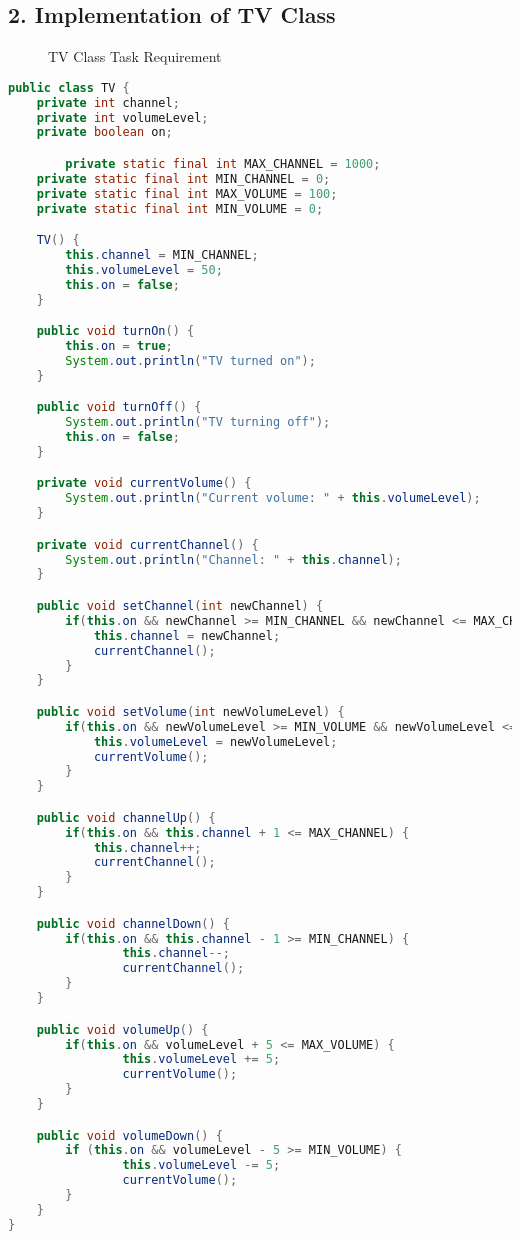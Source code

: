 \documentclass{article}
\begin{document}
\subsection*{2. Implementation of TV Class}

\begin{figure}[h]
    \centering
    \caption{TV Class Task Requirement}
\end{figure}

\begin{lstlisting}[language=Java, caption=TV.java]
public class TV {
    private int channel;
    private int volumeLevel;
    private boolean on;

        private static final int MAX_CHANNEL = 1000;
    private static final int MIN_CHANNEL = 0;
    private static final int MAX_VOLUME = 100;
    private static final int MIN_VOLUME = 0;

    TV() {
        this.channel = MIN_CHANNEL;
        this.volumeLevel = 50;
        this.on = false;
    }

    public void turnOn() {
        this.on = true;
        System.out.println("TV turned on");
    }

    public void turnOff() {
        System.out.println("TV turning off");
        this.on = false;
    }

    private void currentVolume() {
        System.out.println("Current volume: " + this.volumeLevel);
    }

    private void currentChannel() {
        System.out.println("Channel: " + this.channel);
    }

    public void setChannel(int newChannel) {
        if(this.on && newChannel >= MIN_CHANNEL && newChannel <= MAX_CHANNEL) {
            this.channel = newChannel;
            currentChannel();
        }
    }

    public void setVolume(int newVolumeLevel) {
        if(this.on && newVolumeLevel >= MIN_VOLUME && newVolumeLevel <= MAX_VOLUME && newVolumeLevel % 5 == 0) {
            this.volumeLevel = newVolumeLevel;
            currentVolume();
        }
    }

    public void channelUp() {
        if(this.on && this.channel + 1 <= MAX_CHANNEL) {
            this.channel++;
            currentChannel();
        }
    }

    public void channelDown() {
        if(this.on && this.channel - 1 >= MIN_CHANNEL) {
                this.channel--;
                currentChannel();
        }
    }

    public void volumeUp() {
        if(this.on && volumeLevel + 5 <= MAX_VOLUME) {
                this.volumeLevel += 5;
                currentVolume();
        }
    }

    public void volumeDown() {
        if (this.on && volumeLevel - 5 >= MIN_VOLUME) {
                this.volumeLevel -= 5;
                currentVolume();
        }
    }
}
\end{lstlisting}
\end{document}
